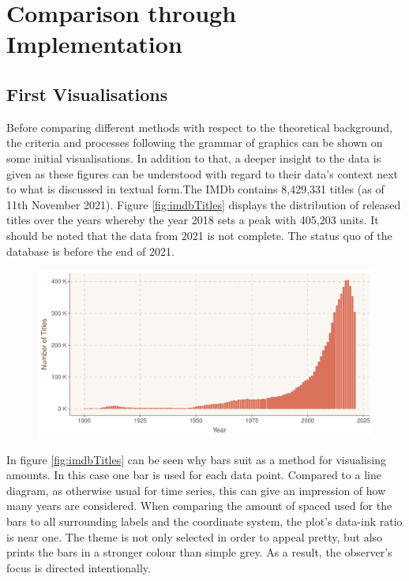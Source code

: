 \chapter{Comparison through Implementation} 

\section{First Visualisations}

Before comparing different methods with respect to the theoretical background, the criteria and processes following the grammar of graphics can be shown on some initial visualisations. In addition to that, a deeper insight to the data is given as these figures can be understood with regard to their data's context next to what is discussed in textual form.The IMDb contains 8,429,331 titles (as of 11th November 2021). Figure \ref{fig:imdbTitles} displays the distribution of released titles over the years whereby the year 2018 sets a peak with 405,203 units. It should be noted that the data from 2021 is not complete. The status quo of the database is before the end of 2021.

\begin{figure}[caption={Released titles per year from 1900 to 2021}, label={fig:imdbTitles}]
	{\includegraphics[width=14.5cm]{figures/titles_per_year.pdf}}
\end{figure}

In figure \ref{fig:imdbTitles} can be seen why bars suit as a method for visualising amounts. In this case one bar is used for each data point. Compared to a line diagram, as otherwise usual for time series, this can give an impression of how many years are considered. When comparing the amount of spaced used for the bars to all surrounding labels and the coordinate system, the plot's data-ink ratio is near one. The theme is not only selected in order to appeal pretty, but also prints the bars in a stronger colour than simple grey. As a result, the observer's focus is directed intentionally. 

